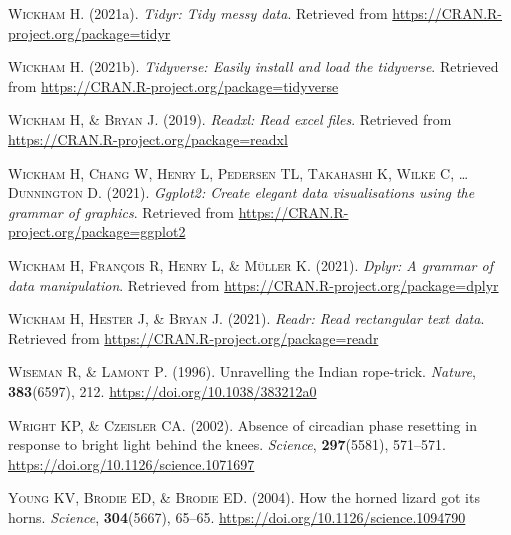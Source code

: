 \documentclass[
  a4paper,
]{article}
\begin{document}
\leavevmode\hypertarget{ref-R-tidyr}{}%
\textsc{Wickham H}. (2021a). \emph{Tidyr: Tidy messy data}. Retrieved from \url{https://CRAN.R-project.org/package=tidyr}

\leavevmode\hypertarget{ref-R-tidyverse}{}%
\textsc{Wickham H}. (2021b). \emph{Tidyverse: Easily install and load the tidyverse}. Retrieved from \url{https://CRAN.R-project.org/package=tidyverse}

\leavevmode\hypertarget{ref-R-readxl}{}%
\textsc{Wickham H, \& Bryan J}. (2019). \emph{Readxl: Read excel files}. Retrieved from \url{https://CRAN.R-project.org/package=readxl}

\leavevmode\hypertarget{ref-R-ggplot2}{}%
\textsc{Wickham H, Chang W, Henry L, Pedersen TL, Takahashi K, Wilke C, \ldots{} Dunnington D}. (2021). \emph{Ggplot2: Create elegant data visualisations using the grammar of graphics}. Retrieved from \url{https://CRAN.R-project.org/package=ggplot2}

\leavevmode\hypertarget{ref-R-dplyr}{}%
\textsc{Wickham H, François R, Henry L, \& Müller K}. (2021). \emph{Dplyr: A grammar of data manipulation}. Retrieved from \url{https://CRAN.R-project.org/package=dplyr}

\leavevmode\hypertarget{ref-R-readr}{}%
\textsc{Wickham H, Hester J, \& Bryan J}. (2021). \emph{Readr: Read rectangular text data}. Retrieved from \url{https://CRAN.R-project.org/package=readr}

\leavevmode\hypertarget{ref-wiseman1996}{}%
\textsc{Wiseman R, \& Lamont P}. (1996). Unravelling the Indian rope-trick. \emph{Nature}, \textbf{383}(6597), 212. \url{https://doi.org/10.1038/383212a0}

\leavevmode\hypertarget{ref-Wright2002}{}%
\textsc{Wright KP, \& Czeisler CA}. (2002). Absence of circadian phase resetting in response to bright light behind the knees. \emph{Science}, \textbf{297}(5581), 571--571. \url{https://doi.org/10.1126/science.1071697}

\leavevmode\hypertarget{ref-Young2004}{}%
\textsc{Young KV, Brodie ED, \& Brodie ED}. (2004). How the horned lizard got its horns. \emph{Science}, \textbf{304}(5667), 65--65. \url{https://doi.org/10.1126/science.1094790}
\end{document}

